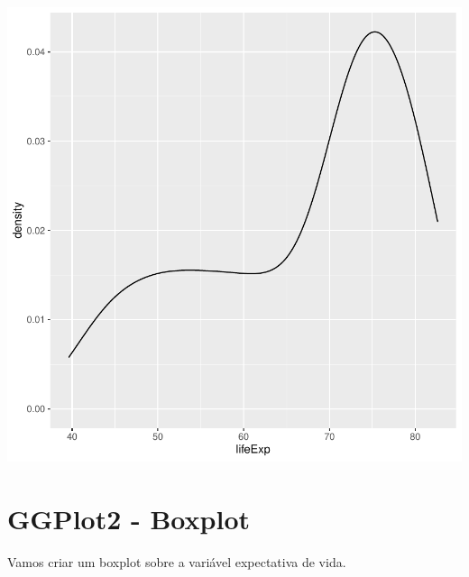 \documentclass[
]{article}
\newenvironment{Shaded}{\begin{snugshade}}{\end{snugshade}}
\newcommand{\DataTypeTok}[1]{\textcolor[rgb]{0.13,0.29,0.53}{#1}}
\newcommand{\KeywordTok}[1]{\textcolor[rgb]{0.13,0.29,0.53}{\textbf{#1}}}
\newcommand{\NormalTok}[1]{#1}
\newcommand{\OperatorTok}[1]{\textcolor[rgb]{0.81,0.36,0.00}{\textbf{#1}}}
\newcommand{\StringTok}[1]{\textcolor[rgb]{0.31,0.60,0.02}{#1}}
\begin{document}
\begin{center}\includegraphics{arquivo_pdf_files/figure-latex/densidade-1} \end{center}

\hypertarget{ggplot2---boxplot}{%
\section{GGPlot2 - Boxplot}\label{ggplot2---boxplot}}

Vamos criar um boxplot sobre a variável expectativa de vida.

\begin{Shaded}
\end{Shaded}
\end{document}
